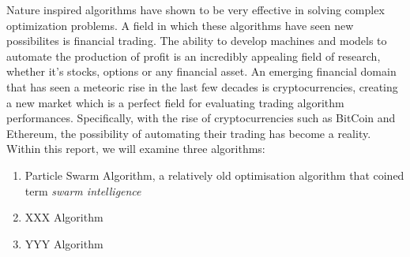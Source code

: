 Nature inspired algorithms have shown to be very effective in solving complex optimization problems. A field in which these algorithms have seen new possibilites
is financial trading. The ability to develop machines and models to automate the production of profit is an incredibly appealing field of research, whether it's 
stocks, options or any financial asset. An emerging financial domain that has seen a meteoric rise in the last few decades is cryptocurrencies, creating a new market 
which is a perfect field for evaluating trading algorithm performances. Specifically, with the rise of cryptocurrencies such as BitCoin and Ethereum, 
the possibility of automating their trading has become a reality. Within this report, we will examine three algorithms:

\begin{enumerate}
    \item Particle Swarm Algorithm, a relatively old optimisation algorithm that coined term \textit{swarm intelligence}
    \item XXX Algorithm
    \item YYY Algorithm
\end{enumerate}